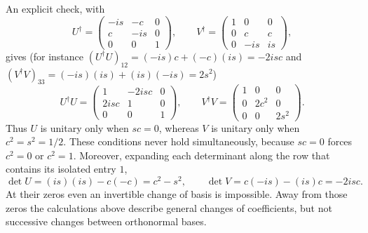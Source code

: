 An explicit check, with
\[
U^\dagger=\begin{pmatrix}-is&-c&0\\c&-is&0\\0&0&1\end{pmatrix},\qquad
V^\dagger=\begin{pmatrix}1&0&0\\0&c&c\\0&-is&is\end{pmatrix},
\]
gives (for instance $(U^\dagger U)_{12}=(-is)c+(-c)(is)=-2isc$ and
$(V^\dagger V)_{33}=(-is)(is)+(is)(-is)=2s^2$)
\[
U^\dagger U=\begin{pmatrix}1&-2isc&0\\2isc&1&0\\0&0&1\end{pmatrix},
\qquad V^\dagger V=\begin{pmatrix}1&0&0\\0&2c^2&0\\0&0&2s^2\end{pmatrix}.
\]
Thus $U$ is unitary only when $sc=0$, whereas $V$ is unitary only when
$c^2=s^2=1/2$. These conditions never hold simultaneously, because
$sc=0$ forces $c^2=0$ or $c^2=1$. Moreover, expanding each determinant
along the row that contains its isolated entry $1$,
\[
\det U=(is)(is)-c(-c)=c^2-s^2,\qquad
\det V=c(-is)-(is)c=-2isc.
\]
At their zeros even an invertible change of basis is impossible. Away
from those zeros the calculations above describe general changes of
coefficients, but not successive changes between orthonormal bases.

